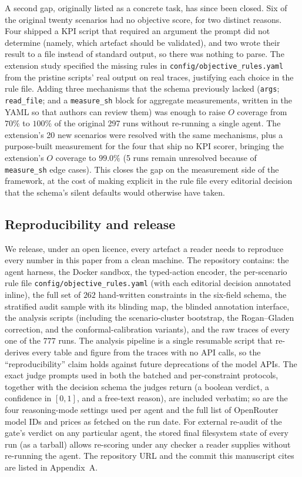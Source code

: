 \documentclass{article}
\begin{document}
A second gap, originally listed as a concrete task, has since been closed. Six of the original twenty scenarios had no objective score, for two distinct reasons. Four shipped a KPI script that required an argument the prompt did not determine (namely, which artefact should be validated), and two wrote their result to a file instead of standard output, so there was nothing to parse. The extension study specified the missing rules in \texttt{config/\allowbreak objective\_rules.yaml} from the pristine scripts' real output on real traces, justifying each choice in the rule file. Adding three mechanisms that the schema previously lacked (\texttt{args}; \texttt{read\_file}; and a \texttt{measure\_sh} block for aggregate measurements, written in the YAML so that authors can review them) was enough to raise $O$ coverage from $70\%$ to $100\%$ of the original 297 runs without re-running a single agent. The extension's 20 new scenarios were resolved with the same mechanisms, plus a purpose-built measurement for the four that ship no KPI scorer, bringing the extension's $O$ coverage to $99.0\%$ (5 runs remain unresolved because of \texttt{measure\_sh} edge cases). This closes the gap on the measurement side of the framework, at the cost of making explicit in the rule file every editorial decision that the schema's silent defaults would otherwise have taken.

\subsection{Reproducibility and release}
\label{sec:release}

We release, under an open licence, every artefact a reader needs to reproduce every number in this paper from a clean machine. The repository contains: the agent harness, the Docker sandbox, the typed-action encoder, the per-scenario rule file \texttt{config/\allowbreak objective\_rules.yaml} (with each editorial decision annotated inline), the full set of $262$ hand-written constraints in the six-field schema, the stratified audit sample with its blinding map, the blinded annotation interface, the analysis scripts (including the scenario-cluster bootstrap, the Rogan--Gladen correction, and the conformal-calibration variants), and the raw traces of every one of the $777$ runs. The analysis pipeline is a single resumable script that re-derives every table and figure from the traces with no API calls, so the ``reproducibility'' claim holds against future deprecations of the model APIs. The exact judge prompts used in both the batched and per-constraint protocols, together with the decision schema the judges return (a boolean verdict, a confidence in $[0,1]$, and a free-text reason), are included verbatim; so are the four reasoning-mode settings used per agent and the full list of OpenRouter model IDs and prices as fetched on the run date. For external re-audit of the gate's verdict on any particular agent, the stored final filesystem state of every run (as a tarball) allows re-scoring under any checker a reader supplies without re-running the agent. The repository URL and the commit this manuscript cites are listed in Appendix~A.
\end{document}
